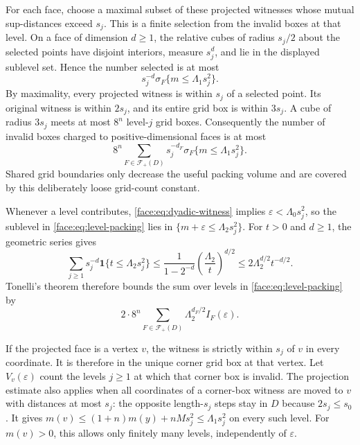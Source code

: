 For each face, choose a maximal subset of these projected witnesses
whose mutual sup-distances exceed $s_j$.  This is a finite selection
from the invalid boxes at that level.  On a face of dimension $d\ge1$,
the relative cubes of radius $s_j/2$ about the selected points have
disjoint interiors, measure $s_j^d$, and lie in the displayed
sublevel set.  Hence the number selected is at most
\[
 s_j^{-d}\sigma_F\{m\le\Lambda_1s_j^2\}.
\]
By maximality, every projected witness is within $s_j$ of a selected
point.  Its original witness is within $2s_j$, and its entire grid
box is within $3s_j$.  A cube of radius $3s_j$ meets at most $8^n$
level-$j$ grid boxes.  Consequently the number of invalid boxes
charged to positive-dimensional faces is at most
\begin{equation}
 \label{face:eq:level-packing}
 8^n\sum_{F\in\mathcal F_+(D)}
 s_j^{-d_F}\sigma_F\{m\le\Lambda_1s_j^2\}.
\end{equation}
Shared grid boundaries only decrease the useful packing volume and
are covered by this deliberately loose grid-count constant.

Whenever a level contributes, \eqref{face:eq:dyadic-witness} implies
$\varepsilon<\Lambda_0s_j^2$, so the sublevel in
\eqref{face:eq:level-packing} lies in
$\{m+\varepsilon\le\Lambda_2s_j^2\}$.
For $t>0$ and $d\ge1$, the geometric series gives
\[
 \sum_{j\ge1}s_j^{-d}\mathbf1\{t\le\Lambda_2s_j^2\}
 \le\frac{1}{1-2^{-d}}\left(\frac{\Lambda_2}t\right)^{d/2}
 \le2\Lambda_2^{d/2}t^{-d/2}.
\]
Tonelli's theorem therefore bounds the sum over levels in
\eqref{face:eq:level-packing} by
\begin{equation}
 \label{face:eq:packing-sum}
 2\cdot8^n\sum_{F\in\mathcal F_+(D)}
 \Lambda_2^{d_F/2}I_F(\varepsilon).
\end{equation}

If the projected face is a vertex $v$, the witness is strictly within
$s_j$ of $v$ in every coordinate.  It is therefore in the unique
corner grid box at that vertex.  Let $V_v(\varepsilon)$ count the
levels $j\ge1$ at which that corner box is invalid.  The projection
estimate also applies when all coordinates of a corner-box witness
are moved to $v$ with distances at most $s_j$: the opposite
length-$s_j$ steps stay in $D$ because $2s_j\le s_0$.
It gives
$m(v)\le(1+n)m(y)+nMs_j^2\le\Lambda_1s_j^2$ on every such level.
For $m(v)>0$, this
allows only finitely many levels, independently of
$\varepsilon$.

